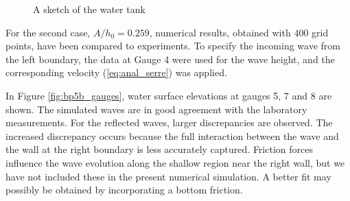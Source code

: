 \documentclass[review]{elsarticle}
\newcommand{\m}{\,\mathrm{m}}
\begin{document}
\begin{figure}[!htb]
\centering
{}
  \caption{A sketch of the water tank}
  \label{fig:bp5_water_tank}
\end{figure}

For the second case, $A/h_0=0.259$, numerical results, obtained with  
$400$ grid points, have been compared to experiments. 
To specify the incoming wave from the left boundary, 
the data at Gauge 4 were used for the wave height,
and the corresponding velocity (\ref{eq:anal_serre})
was applied.

In Figure \ref{fig:bp5b_gauges}, water surface elevations at gauges 5, 7 and 8 are shown. 
The simulated waves are in good agreement with the laboratory measurements. 
For the reflected waves, larger discrepancies are observed.
The increased discrepancy occurs because the full interaction between the wave and the wall
at the right boundary is less accurately captured.
Friction forces influence the wave evolution along the shallow region near the right wall,
but we have not included these in the present numerical simulation.
A better fit may possibly be obtained by incorporating a bottom friction.
\end{document}
